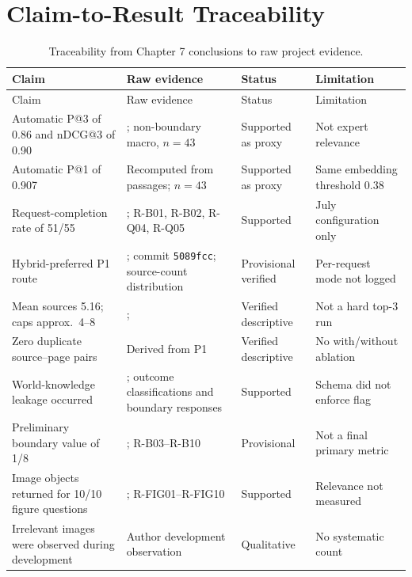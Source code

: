 \section{Claim-to-Result Traceability}
\label{sec:claim-traceability}

{\scriptsize
\begin{longtable}{L{0.27\textwidth}L{0.25\textwidth}L{0.15\textwidth}L{0.21\textwidth}}
\caption{Traceability from Chapter 7 conclusions to raw project evidence.}\label{tab:claim-traceability}\\
\toprule
Claim & Raw evidence & Status & Limitation \\
\midrule
\endfirsthead
\toprule
Claim & Raw evidence & Status & Limitation \\
\midrule
\endhead
Automatic P@3 of 0.86 and nDCG@3 of 0.90 & ; non-boundary macro, $n=43$ & Supported as proxy & Not expert relevance \\
Automatic P@1 of 0.907 & Recomputed from  passages; $n=43$ & Supported as proxy & Same embedding threshold 0.38 \\
Request-completion rate of 51/55 & ; R-B01, R-B02, R-Q04, R-Q05 & Supported & July configuration only \\
Hybrid-preferred P1 route & ; commit \texttt{5089fcc}; source-count distribution & Provisional verified & Per-request mode not logged \\
Mean sources 5.16; caps approx.\ 4--8 & ;  & Verified descriptive & Not a hard top-3 run \\
Zero duplicate source--page pairs & Derived from P1  & Verified descriptive & No with/without ablation \\
World-knowledge leakage occurred & ; outcome classifications and boundary responses & Supported & Schema did not enforce flag \\
Preliminary boundary value of 1/8 & ; R-B03--R-B10 & Provisional & Not a final primary metric \\
Image objects returned for 10/10 figure questions & ; R-FIG01--R-FIG10 & Supported & Relevance not measured \\
Irrelevant images were observed during development & Author development observation & Qualitative & No systematic count \\

\end{longtable}}
